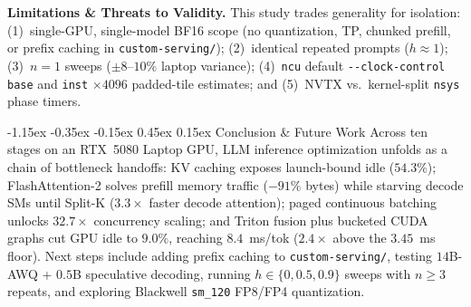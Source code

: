 \documentclass[10pt,twocolumn]{article}
\makeatletter
\renewcommand\section{\@startsection{section}{1}{\z@}%
  {-1.15ex \@plus -0.35ex \@minus -0.15ex}%
  {0.45ex \@plus 0.15ex}%
  {\normalfont\large\bfseries}}
\newcommand{\code}[1]{\texttt{\small #1}}
\makeatother
\begin{document}
\textbf{Limitations \& Threats to Validity.}
This study trades generality for isolation: (1)~single-GPU, single-model BF16 scope (no quantization, TP, chunked prefill, or prefix caching in \code{custom-serving/}); (2)~identical repeated prompts ($h{\approx}1$); (3)~$n{=}1$ sweeps ($\pm 8$--$10\%$ laptop variance); (4)~\code{ncu} default \code{-{}-clock-control base} and \code{inst} $\times 4096$ padded-tile estimates; and (5)~NVTX vs.\ kernel-split \code{nsys} phase timers.

\section{Conclusion \& Future Work}
Across ten stages on an RTX~5080 Laptop GPU, LLM inference optimization unfolds as a chain of bottleneck handoffs: KV caching exposes launch-bound idle ($54.3\%$); FlashAttention-2 solves prefill memory traffic ($-91\%$ bytes) while starving decode SMs until Split-K ($3.3\times$ faster decode attention); paged continuous batching unlocks $32.7\times$ concurrency scaling; and Triton fusion plus bucketed CUDA graphs cut GPU idle to $9.0\%$, reaching $8.4$~ms/tok ($2.4\times$ above the $3.45$~ms floor). Next steps include adding prefix caching to \code{custom-serving/}, testing $14$B-AWQ + $0.5$B speculative decoding, running $h \in \{0, 0.5, 0.9\}$ sweeps with $n \ge 3$ repeats, and exploring Blackwell \code{sm\_120} FP8/FP4 quantization.

\newpage
\renewcommand{\bibfont}{\footnotesize}
\setlength{\bibsep}{2.5pt plus 0.5pt}


\end{document}
